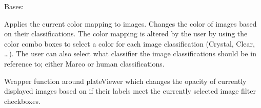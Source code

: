 \documentclass[letterpaper,10pt,english]{sphinxmanual}
\begin{document}
\begin{fulllineitems}
\label{\detokenize{polo.widgets:polo.widgets.plate_inspector_widget.PlateInspectorWidget}}
Bases: 

\begin{fulllineitems}
\label{\detokenize{polo.widgets:polo.widgets.plate_inspector_widget.PlateInspectorWidget.apply_color_mapping}}
Applies the current color mapping to images. Changes the color of
images based on their classifications. The color mapping is altered by
the user by using the color combo boxes to select a color for each
image classification (Crystal, Clear, …). The user can also select
what classifier the image classifications should be in reference to;
either Marco or human classifications.

\end{fulllineitems}


\begin{fulllineitems}
\label{\detokenize{polo.widgets:polo.widgets.plate_inspector_widget.PlateInspectorWidget.apply_image_filters}}
Wrapper function around plateViewer 
which changes the opacity of currently displayed images based on if
their labels meet the currently selected image filter checkboxes.

\end{fulllineitems}



\end{fulllineitems}
\end{document}
